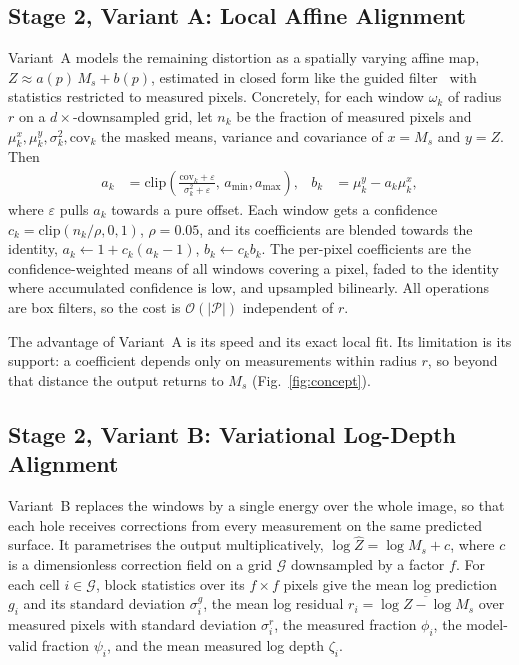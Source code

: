 \documentclass[conference]{IEEEtran}
\newcommand{\Dm}{Z}            %
\newcommand{\Dp}{M}            %
\begin{document}
\subsection{Stage 2, Variant A: Local Affine Alignment}
\label{sec:affine}
Variant~A models the remaining distortion as a spatially varying affine map,
\(\Dm \approx a(p)\,\Dp_s + b(p)\), estimated in closed form like the guided
filter~\cite{he2013guided} with statistics restricted to measured pixels.
Concretely, for each window \(\omega_k\) of radius \(r\) on a
\(d{\times}\)-downsampled grid, let \(n_k\) be the fraction of measured pixels
and \(\mu^x_k,\mu^y_k,\sigma^2_k,\mathrm{cov}_k\) the masked means, variance
and covariance of \(x=\Dp_s\) and \(y=\Dm\). Then
\begin{align}
  a_k &= \mathrm{clip}\!\left(\frac{\mathrm{cov}_k+\varepsilon}{\sigma^2_k+\varepsilon},
         \,a_{\min},a_{\max}\right), &
  b_k &= \mu^y_k - a_k\mu^x_k ,
\end{align}
where \(\varepsilon\) pulls \(a_k\) towards a pure offset. Each window gets a
confidence \(c_k=\mathrm{clip}(n_k/\rho,0,1)\), \(\rho=0.05\), and its
coefficients are blended towards the identity,
\(a_k\leftarrow 1+c_k(a_k-1)\), \(b_k\leftarrow c_kb_k\). The per-pixel
coefficients are the confidence-weighted means of all windows covering a pixel,
faded to the identity where accumulated confidence is low, and upsampled
bilinearly. All operations are box filters, so the cost is
\(\mathcal{O}(|\mathcal{P}|)\) independent of \(r\).

The advantage of Variant~A is its speed and its exact local fit. Its
limitation is its support: a coefficient depends only on measurements within
radius \(r\), so beyond that distance the output returns to \(\Dp_s\)
(Fig.~\ref{fig:concept}).

\subsection{Stage 2, Variant B: Variational Log-Depth Alignment}
\label{sec:fusion}
Variant~B replaces the windows by a single energy over the whole image, so
that each hole receives corrections from every measurement on the same
predicted surface. It parametrises the output multiplicatively,
\(\log \hat \Dm = \log \Dp_s + c\), where \(c\) is a dimensionless correction
field on a grid \(\mathcal{G}\) downsampled by a factor \(f\). For each cell
\(i\in\mathcal{G}\), block statistics over its \(f{\times}f\) pixels give the
mean log prediction \(g_i\) and its standard deviation \(\sigma^g_i\), the
mean log residual \(r_i=\overline{\log \Dm-\log \Dp_s}\) over measured pixels
with standard deviation \(\sigma^r_i\), the measured fraction \(\phi_i\), the
model-valid fraction \(\psi_i\), and the mean measured log depth \(\zeta_i\).
\end{document}
